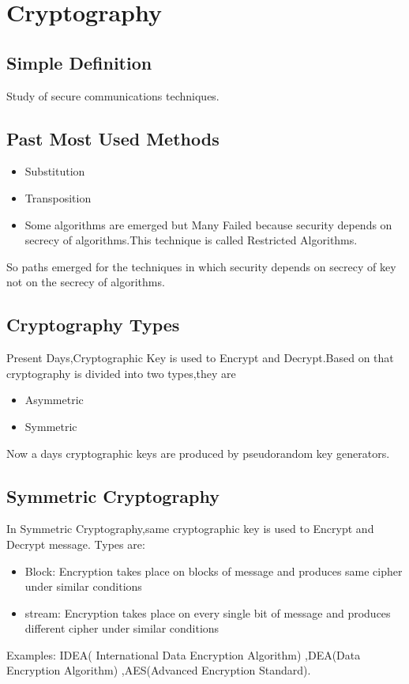 \documentclass[12pt,a4paper]{report}
\begin{document}
\chapter{Cryptography}\label{chap:meth}

\section{Simple Definition}
Study of secure communications techniques.

\section{Past Most Used Methods}
\begin{itemize}
\item Substitution
\item Transposition
\item Some algorithms are emerged but Many Failed because security depends on secrecy of algorithms.This technique is called Restricted Algorithms.
\end{itemize}

So paths emerged for the techniques in which security depends  on secrecy of key not on the secrecy of algorithms.

\section{Cryptography Types}
Present Days,Cryptographic Key is used to Encrypt and Decrypt.Based on that cryptography is divided into two types,they are
\begin{itemize}
\item Asymmetric
\item Symmetric
\end{itemize}
Now a days cryptographic keys are produced by pseudorandom key generators.
\section{Symmetric Cryptography}
In Symmetric Cryptography,same cryptographic key is used to Encrypt and Decrypt message.
Types are:
\begin{itemize}
\item Block:
Encryption takes place on blocks of message and produces same cipher under similar conditions
\item stream:
Encryption takes place on every single bit of message and produces different cipher under similar conditions
\end{itemize}
Examples: IDEA( International Data Encryption Algorithm) ,DEA(Data Encryption Algorithm) ,AES(Advanced Encryption Standard).
\end{document}
